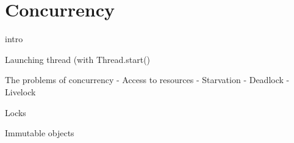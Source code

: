 
\section{Concurrency}
\label{sec:concurrency}

intro

Launching thread (with Thread.start()

The problems of concurrency
  - Access to resources
    - Starvation
    - Deadlock
    - Livelock

Locks

Immutable objects

